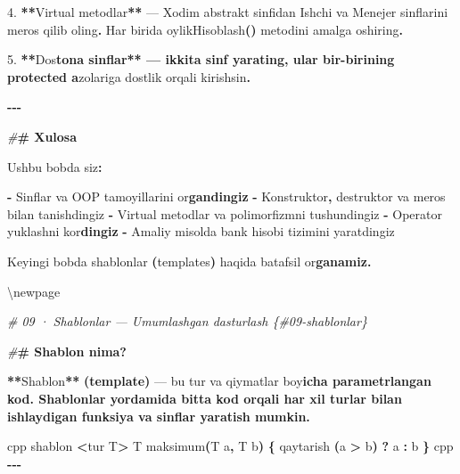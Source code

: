 \documentclass[a4paper,11pt,twoside,openright]{book}
\newenvironment{Shaded}{\begin{snugshade}}{\end{snugshade}}
\newcommand{\CharTok}[1]{\textcolor[rgb]{0.31,0.60,0.02}{#1}}
\newcommand{\ErrorTok}[1]{\textcolor[rgb]{0.64,0.00,0.00}{\textbf{#1}}}
\newcommand{\FloatTok}[1]{\textcolor[rgb]{0.00,0.00,0.81}{#1}}
\newcommand{\KeywordTok}[1]{\textcolor[rgb]{0.13,0.29,0.53}{\textbf{#1}}}
\newcommand{\NormalTok}[1]{#1}
\newcommand{\OperatorTok}[1]{\textcolor[rgb]{0.81,0.36,0.00}{\textbf{#1}}}
\newcommand{\PreprocessorTok}[1]{\textcolor[rgb]{0.56,0.35,0.01}{\textit{#1}}}
\begin{document}
\begin{Shaded}
\begin{Highlighting}[]
\FloatTok{4.} \OperatorTok{**}\NormalTok{Virtual metodlar}\OperatorTok{**}\NormalTok{ — }\ErrorTok{\textasciigrave{}}\NormalTok{Xodim}\ErrorTok{\textasciigrave{}}\NormalTok{ abstrakt sinfidan }\ErrorTok{\textasciigrave{}}\NormalTok{Ishchi}\ErrorTok{\textasciigrave{}}\NormalTok{ va }\ErrorTok{\textasciigrave{}}\NormalTok{Menejer}\ErrorTok{\textasciigrave{}}\NormalTok{ sinflarini meros qilib oling}\OperatorTok{.}\NormalTok{ Har birida }\ErrorTok{\textasciigrave{}}\NormalTok{oylikHisoblash}\OperatorTok{()}\ErrorTok{\textasciigrave{}}\NormalTok{ metodini amalga oshiring}\OperatorTok{.}

\FloatTok{5.} \OperatorTok{**}\NormalTok{Do}\CharTok{\textquotesingle{}s}\ErrorTok{tona sinflar** — ikkita sinf yarating, ular bir{-}birining \textasciigrave{}protected\textasciigrave{} a}\CharTok{\textquotesingle{}}\NormalTok{zolariga dostlik orqali kirishsin}\OperatorTok{.}

\OperatorTok{{-}{-}{-}}

\PreprocessorTok{\#}\ErrorTok{\# Xulosa}

\NormalTok{Ushbu bobda siz}\OperatorTok{:}

\OperatorTok{{-}}\NormalTok{ Sinflar va OOP tamoyillarini o}\CharTok{\textquotesingle{}r}\ErrorTok{gandingiz}
\OperatorTok{{-}}\NormalTok{ Konstruktor}\OperatorTok{,}\NormalTok{ destruktor va meros bilan tanishdingiz}
\OperatorTok{{-}}\NormalTok{ Virtual metodlar va polimorfizmni tushundingiz}
\OperatorTok{{-}}\NormalTok{ Operator yuklashni ko}\CharTok{\textquotesingle{}r}\ErrorTok{dingiz}
\OperatorTok{{-}}\NormalTok{ Amaliy misolda bank hisobi tizimini yaratdingiz}

\NormalTok{Keyingi bobda shablonlar }\OperatorTok{(}\NormalTok{templates}\OperatorTok{)}\NormalTok{ haqida batafsil o}\CharTok{\textquotesingle{}r}\ErrorTok{ganamiz.}


\NormalTok{\textbackslash{}newpage}

\PreprocessorTok{\# 09 · Shablonlar — Umumlashgan dasturlash \{\#09{-}shablonlar\}}

\PreprocessorTok{\#}\ErrorTok{\# Shablon nima?}

\OperatorTok{**}\NormalTok{Shablon}\OperatorTok{**} \OperatorTok{(}\KeywordTok{template}\OperatorTok{)}\NormalTok{ — bu tur va qiymatlar bo}\CharTok{\textquotesingle{}y}\ErrorTok{icha parametrlangan kod. Shablonlar yordamida bitta kod orqali har xil turlar bilan ishlaydigan funksiya va sinflar yaratish mumkin.}

\ErrorTok{\textasciigrave{}\textasciigrave{}\textasciigrave{}}\NormalTok{cpp}
\NormalTok{shablon }\OperatorTok{\textless{}}\NormalTok{tur T}\OperatorTok{\textgreater{}}
\NormalTok{T maksimum}\OperatorTok{(}\NormalTok{T a}\OperatorTok{,}\NormalTok{ T b}\OperatorTok{)} \OperatorTok{\{}
\NormalTok{    qaytarish }\OperatorTok{(}\NormalTok{a }\OperatorTok{\textgreater{}}\NormalTok{ b}\OperatorTok{)} \OperatorTok{?}\NormalTok{ a }\OperatorTok{:}\NormalTok{ b}
\OperatorTok{\}}
\ErrorTok{\textasciigrave{}\textasciigrave{}\textasciigrave{}}\NormalTok{cpp}
\OperatorTok{{-}{-}{-}}


\end{Highlighting}
\end{Shaded}
\end{document}
